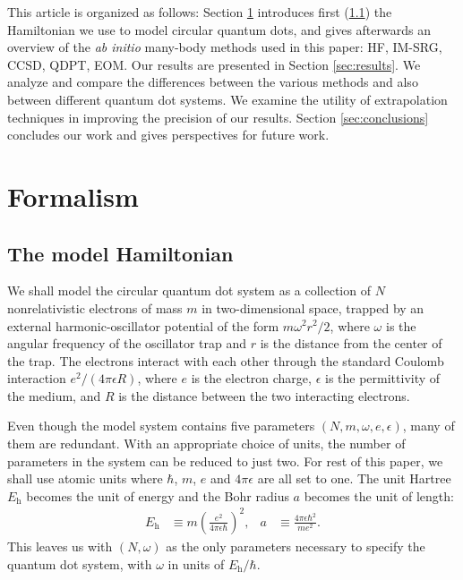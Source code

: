 This article is organized as follows: Section \ref{sec:formalism} introduces first (\ref{subsec:modelHamiltonian}) the Hamiltonian we use to model circular quantum dots, and gives afterwards an overview of the \textit{ab initio} many-body methods used in this paper: HF, IM-SRG, CCSD, QDPT, EOM.  Our results are presented in Section \ref{sec:results}.  We analyze and compare the differences between the various methods and also between different quantum dot systems.  We examine the utility of extrapolation techniques in improving the precision of our results.  Section \ref{sec:conclusions} concludes our work and gives perspectives for future work.

\section{Formalism}
\label{sec:formalism}

\subsection{The model Hamiltonian}
\label{subsec:modelHamiltonian}

We shall model the circular quantum dot system as a collection of $N$ nonrelativistic electrons of mass $m$ in two-dimensional space, trapped by an external harmonic-oscillator potential of the form $m \omega^2r^2 / 2$, where $\omega$ is the angular frequency of the oscillator trap and $r$ is the distance from the center of the trap.  The electrons interact with each other through the standard Coulomb interaction $e^2 / (4 \pi \epsilon R)$, where $e$ is the electron charge, $\epsilon$ is the permittivity of the medium, and $R$ is the distance between the two interacting electrons.

Even though the model system contains five parameters $(N, m, \omega, e, \epsilon)$, many of them are redundant.  With an appropriate choice of units, the number of parameters in the system can be reduced to just two.  For rest of this paper, we shall use atomic units where $\hbar$, $m$, $e$ and $4 \pi \epsilon$ are all set to one.  The unit Hartree $E_{\mathrm{h}}$ becomes the unit of energy and the Bohr radius $a$ becomes the unit of length:
\begin{align*}
  E_{\mathrm{h}} &\equiv m \left(\frac{e^2}{4 \pi \epsilon \hbar}\right)^2, &
  a &\equiv \frac{4 \pi \epsilon \hbar^2}{m e^2}.
\end{align*}
This leaves us with $(N, \omega)$ as the only parameters necessary to specify the quantum dot system, with $\omega$ in units of $E_{\mathrm{h}} / \hbar$.

